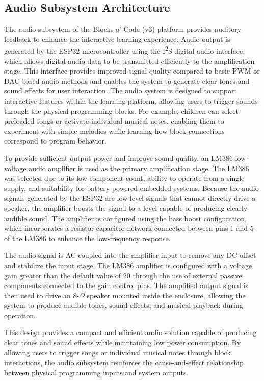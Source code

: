 \documentclass[10pt, conference]{IEEEtran}
\begin{document}
\subsection{Audio Subsystem Architecture}
The audio subsystem of the Blocks o’ Code (v3) platform provides auditory feedback to enhance the interactive learning experience. Audio output is generated by the ESP32 microcontroller using the I\textsuperscript{2}S digital audio interface, which allows digital audio data to be transmitted efficiently to the amplification stage. This interface provides improved signal quality compared to basic PWM or DAC-based audio methods and enables the system to generate clear tones and sound effects for user interaction. The audio system is designed to support interactive features within the learning platform, allowing users to trigger sounds through the physical programming blocks. For example, children can select preloaded songs or activate individual musical notes, enabling them to experiment with simple melodies while learning how block connections correspond to program behavior.

To provide sufficient output power and improve sound quality, an LM386 low-voltage audio amplifier is used as the primary amplification stage. The LM386 was selected due to its low component count, ability to operate from a single supply, and suitability for battery-powered embedded systems. Because the audio signals generated by the ESP32 are low-level signals that cannot directly drive a speaker, the amplifier boosts the signal to a level capable of producing clearly audible sound. The amplifier is configured using the bass boost configuration, which incorporates a resistor-capacitor network connected between pins 1 and 5 of the LM386 to enhance the low-frequency response.

The audio signal is AC-coupled into the amplifier input to remove any DC offset and stabilize the input stage. The LM386 amplifier is configured with a voltage gain greater than the default value of 20 through the use of external passive components connected to the gain control pins. The amplified output signal is then used to drive an 8-$\Omega$ speaker mounted inside the enclosure, allowing the system to produce audible tones, sound effects, and musical playback during operation.

This design provides a compact and efficient audio solution capable of producing clear tones and sound effects while maintaining low power consumption. By allowing users to trigger songs or individual musical notes through block interactions, the audio subsystem reinforces the cause-and-effect relationship between physical programming inputs and system outputs.
\end{document}
